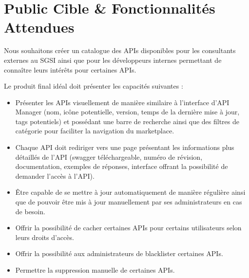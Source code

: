 \section{Public Cible \& Fonctionnalités Attendues}
Nous souhaitons créer un catalogue des APIs disponibles pour les consultants externes au SGSI ainsi que pour les développeurs internes permettant de connaître leurs intérêts pour certaines APIs.

Le produit final idéal doit présenter les capacités suivantes :
\begin{itemize}
    \item[$\rightarrow$] Présenter les APIs visuellement de manière similaire à l'interface d'API Manager (nom, icône potentielle, version, temps de la dernière mise à jour, tags potentiels) et possédant une barre de recherche ainsi que des filtres de catégorie pour faciliter la navigation du marketplace.
    \item[$\rightarrow$] Chaque API doit rediriger vers une page présentant les informations plus détaillés de l'API (swagger téléchargeable, numéro de révision, documentation, exemples de réponses, interface offrant la possibilité de demander l'accès à l'API).
    \item[$\rightarrow$] Être capable de se mettre à jour automatiquement de manière régulière ainsi que de pouvoir être mis à jour manuellement par ses administrateurs en cas de besoin.
    \item[$\rightarrow$] Offrir la possibilité de cacher certaines APIs pour certains utilisateurs selon leurs droits d'accès.
    \item[$\rightarrow$] Offrir la possibilité aux administrateurs de blacklister certaines APIs. %
    \item[$\rightarrow$] Permettre la suppression manuelle de certaines APIs.
\end{itemize}

